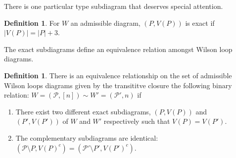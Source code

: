 \documentclass[11pt]{article}
\newcommand{\cP}{\mathcal{P}}
\theoremstyle{remark}
\theoremstyle{definition}
\newtheorem{dfn}[thm]{Definition}
\begin{document}
There is one particular type subdiagram that deserves special attention.

\begin{dfn}
For $W$ an admissible diagram, $(P, V(P))$ is exact if $|V(P)| = |P| + 3$.
\end{dfn}

The exact subdiagrams define an equivalence relation amongst Wilson loop diagrams.

\begin{dfn}\label{equivdfn} 
There is an equivalence relationship on the set of admissible Wilson loops diagrams given by the transititve closure the following binary relation: $W = (\cP, [n]) \sim W'= (\cP', n)$ if
\begin{enumerate}
\item There exist two different exact subdiagrams, $(P, V(P))$ and $(P', V(P'))$ of $W$ and $W'$ respectively such that $V(P) =  V(P')$.
\item The complementary subdiagrams are identical: $(\cP \setminus P, V(P)^c) = (\cP' \setminus P', V(P')^c)$.
\end{enumerate}
\end{dfn}
\end{document}

